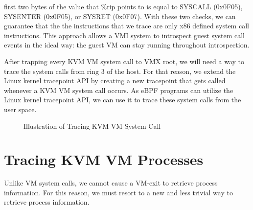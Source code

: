 \documentclass{report}
\begin{document}
\begin{spacing}{1.5}
{first two bytes of the value that \%rip points to is equal to SYSCALL (0x0F05), SYSENTER (0x0F05), or SYSRET (0x0F07). With these two checks, we can guarantee that the the instructions that we trace are only x86 defined system call instructions. This approach allows a VMI system to introspect guest system call events in the ideal way: the guest VM can stay running throughout introspection.
\leavevmode\newline
}

{\large
After trapping every KVM VM system call to VMX root, we  will need a way to trace the system calls from ring 3 of the host. For that reason, we extend the Linux kernel tracepoint API by creating a new tracepoint that gets called whenever a KVM VM system call occurs. As eBPF programs can utilize the Linux kernel tracepoint API, we can use it to trace these system calls from the user space.  
\leavevmode\newline
}


\newpage
\vfill
{}
\begin{figure}[ht]
\centering
  \caption{Illustration of Tracing KVM VM System Call}
\end{figure}



\section{Tracing KVM VM Processes}

{\large
Unlike VM system calls, we cannot cause a VM-exit to retrieve process information. For this reason, we must resort to a new and less trivial way to retrieve process information.
\newline
}


\end{spacing}
\end{document}
